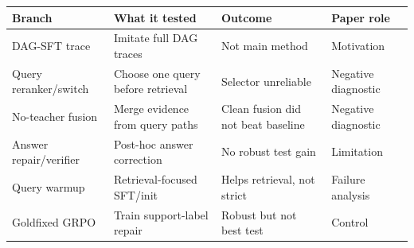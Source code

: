 \begin{tabular}{llll}
\toprule
Branch & What it tested & Outcome & Paper role \\
\midrule
DAG-SFT trace & Imitate full DAG traces & Not main method & Motivation \\
Query reranker/switch & Choose one query before retrieval & Selector unreliable & Negative diagnostic \\
No-teacher fusion & Merge evidence from query paths & Clean fusion did not beat baseline & Negative diagnostic \\
Answer repair/verifier & Post-hoc answer correction & No robust test gain & Limitation \\
Query warmup & Retrieval-focused SFT/init & Helps retrieval, not strict & Failure analysis \\
Goldfixed GRPO & Train support-label repair & Robust but not best test & Control \\
\bottomrule
\end{tabular}
